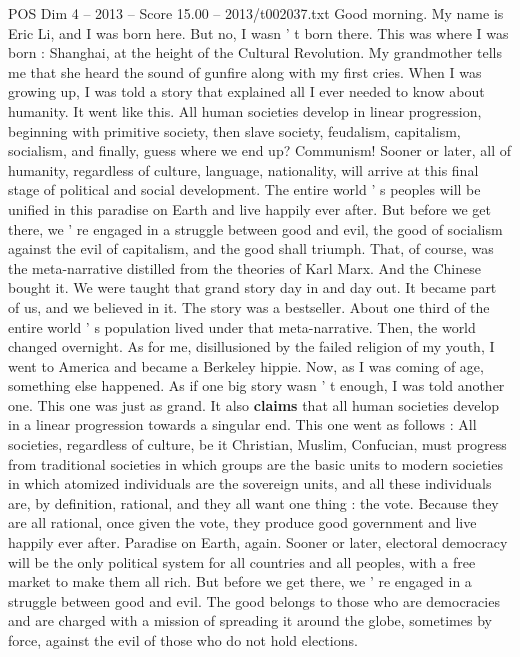 \begin{textsample}{POS Dim 4 – 2013 – Score 15.00 – 2013/t002037.txt}  \label{ex:f4_pos_078}
Good morning.
My name is Eric Li, and I was born here.
But no, I wasn ' t born there.
This was where I was born : Shanghai, at the height of the Cultural Revolution.
My grandmother tells me that she heard the sound of gunfire along with my first cries.
When I was growing up, I was told a story that explained all I ever needed to know about humanity.
It went like this.
All human societies develop in linear progression, beginning with primitive society, then slave society, feudalism, capitalism, socialism, and finally, guess where we end up?
Communism!
Sooner or later, all of humanity, regardless of culture, language, nationality, will arrive at this final stage of political and social development.
The entire world ' s peoples will be unified in this paradise on Earth and live happily ever after.
But before we get there, we ' re engaged in a struggle between good and evil, the good of socialism against the evil of capitalism, and the good shall triumph.
That, of course, was the meta-narrative distilled from the theories of Karl Marx.
And the Chinese bought it.
We were taught that grand story day in and day out.
It became part of us, and we believed in it.
The story was a bestseller.
About one third of the entire world ' s population lived under that meta-narrative.
Then, the world changed overnight.
As for me, disillusioned by the failed religion of my youth, I went to America and became a Berkeley hippie.
Now, as I was coming of age, something else happened.
As if one big story wasn ' t enough, I was told another one.
This one was just as grand.
It also \textbf{claims} that all human societies develop in a linear progression towards a singular end.
This one went as follows : All societies, regardless of culture, be it Christian, Muslim, Confucian, must progress from traditional societies in which groups are the basic units to modern societies in which atomized individuals are the sovereign units, and all these individuals are, by definition, rational, and they all want one thing : the vote.
Because they are all rational, once given the vote, they produce good government and live happily ever after.
Paradise on Earth, again.
Sooner or later, electoral democracy will be the only political system for all countries and all peoples, with a free market to make them all rich.
But before we get there, we ' re engaged in a struggle between good and evil.
The good belongs to those who are democracies and are charged with a mission of spreading it around the globe, sometimes by force, against the evil of those who do not hold elections.

\end{textsample}
